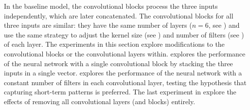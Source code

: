 
In the baseline model, the convolutional blocks process the
three inputs independently, which are later concatenated.
The convolutional blocks for all three inputs are similar:
they have the same number of layers ($n=6$, see
) and use the
same strategy to adjust the kernel size (see
) and number of filters (see
) of each layer. The
experiments in this section explore modifications to the
convolutional blocks or the convolutional layers within.
 explores the
performance of the neural network with a single
convolutional block by stacking the three inputs in a single
vector.  explores the
performance of the neural network with a constant number of
filters in each convolutional layer, testing the hypothesis
that capturing short-term patterns is preferred. The last
experiment in  explore
the effects of removing all convolutional layers (and
blocks) entirely.
